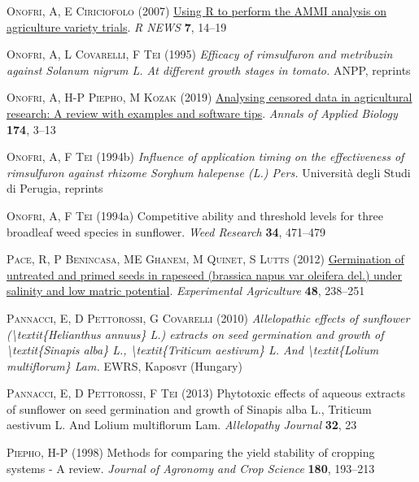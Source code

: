 \documentclass[
  letterpaper,
  DIV=11,
  numbers=noendperiod]{scrreprt}
\newlength{\cslhangindent}
\newenvironment{CSLReferences}[2] %
 {\begin{list}{}{%
  \setlength{\itemindent}{0pt}
  \setlength{\leftmargin}{0pt}
  \setlength{\parsep}{0pt}
  \ifodd #1
   \setlength{\leftmargin}{\cslhangindent}
   \setlength{\itemindent}{-1\cslhangindent}
  \fi
  \setlength{\itemsep}{#2\baselineskip}}}
 {\end{list}}
\begin{document}
\begin{CSLReferences}{1}{0}
\textsc{Onofri, A, E Ciriciofolo} (2007)
\href{https://www.r-project.org}{Using {R} to perform the {AMMI}
analysis on agriculture variety trials}. \emph{R NEWS} \textbf{7},
14--19

\textsc{Onofri, A, L Covarelli, F Tei} (1995) \emph{Efficacy of
rimsulfuron and metribuzin against {Solanum} nigrum {L}. At different
growth stages in tomato.} ANPP, reprints

\textsc{Onofri, A, H-P Piepho, M Kozak} (2019)
\href{https://doi.org/10.1111/aab.12477}{Analysing censored data in
agricultural research: {A} review with examples and software tips}.
\emph{Annals of Applied Biology} \textbf{174}, 3--13

\textsc{Onofri, A, F Tei} (1994b) \emph{Influence of application timing
on the effectiveness of rimsulfuron against rhizome \emph{{Sorghum}
halepense} ({L}.) {Pers}.} Universit{à} degli Studi di Perugia, reprints

\textsc{Onofri, A, F Tei} (1994a) Competitive ability and threshold
levels for three broadleaf weed species in sunflower. \emph{Weed
Research} \textbf{34}, 471--479

\textsc{Pace, R, P Benincasa, ME Ghanem, M Quinet, S Lutts} (2012)
\href{https://doi.org/10.1017/S0014479711001189}{Germination of
untreated and primed seeds in rapeseed (brassica napus var oleifera
del.) under salinity and low matric potential}. \emph{Experimental
Agriculture} \textbf{48}, 238--251

\textsc{Pannacci, E, D Pettorossi, G Covarelli} (2010)
\emph{Allelopathic effects of sunflower
({\textbackslash{}}textit\{{Helianthus} annuus\} {L}.) extracts on seed
germination and growth of {\textbackslash{}}textit\{{Sinapis} alba\}
{L}., {\textbackslash{}}textit\{{Triticum} aestivum\} {L}. And
{\textbackslash{}}textit\{{Lolium} multiflorum\} {Lam}.} EWRS, Kaposvr
(Hungary)

\textsc{Pannacci, E, D Pettorossi, F Tei} (2013) Phytotoxic effects of
aqueous extracts of sunflower on seed germination and growth of
{Sinapis} alba {L}., {Triticum} aestivum {L}. And {Lolium} multiflorum
{Lam}. \emph{Allelopathy Journal} \textbf{32}, 23

\textsc{Piepho, H-P} (1998) Methods for comparing the yield stability of
cropping systems - {A} review. \emph{Journal of Agronomy and Crop
Science} \textbf{180}, 193--213


\end{CSLReferences}
\end{document}

